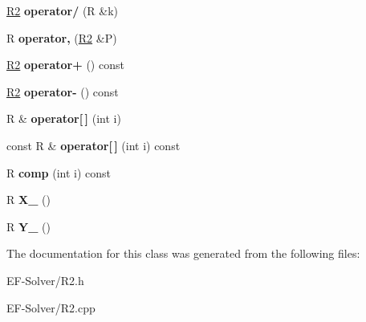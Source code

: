 \begin{DoxyCompactItemize}
\item 
\hyperlink{class_r2}{R2} {\bfseries operator/} (R \&k)\hypertarget{class_r2_af93a8e4a44d871d0330c647f56ab0d6f}{}\label{class_r2_af93a8e4a44d871d0330c647f56ab0d6f}

\item 
R {\bfseries operator,} (\hyperlink{class_r2}{R2} \&P)\hypertarget{class_r2_af741f4176f92a808b6d40d4c20af161f}{}\label{class_r2_af741f4176f92a808b6d40d4c20af161f}

\item 
\hyperlink{class_r2}{R2} {\bfseries operator+} () const \hypertarget{class_r2_a43ec9dd196c4c006ba2cf73c6c7317a3}{}\label{class_r2_a43ec9dd196c4c006ba2cf73c6c7317a3}

\item 
\hyperlink{class_r2}{R2} {\bfseries operator-\/} () const \hypertarget{class_r2_a6b64594c5483c1d56612efa3b52de65a}{}\label{class_r2_a6b64594c5483c1d56612efa3b52de65a}

\item 
R \& {\bfseries operator\mbox{[}$\,$\mbox{]}} (int i)\hypertarget{class_r2_a9648847349f8154bbdb3a0a86bb62ba2}{}\label{class_r2_a9648847349f8154bbdb3a0a86bb62ba2}

\item 
const R \& {\bfseries operator\mbox{[}$\,$\mbox{]}} (int i) const \hypertarget{class_r2_a457945edaa6b37c0aab2854208b61d87}{}\label{class_r2_a457945edaa6b37c0aab2854208b61d87}

\item 
R {\bfseries comp} (int i) const \hypertarget{class_r2_a6f99ccdcd33291ca61b38685a69565ca}{}\label{class_r2_a6f99ccdcd33291ca61b38685a69565ca}

\item 
R {\bfseries X\+\_\+} ()\hypertarget{class_r2_a31773713c895df08e2ee63e56dadb4e9}{}\label{class_r2_a31773713c895df08e2ee63e56dadb4e9}

\item 
R {\bfseries Y\+\_\+} ()\hypertarget{class_r2_a914b12a0f135ece9e36a8dbeeed71a46}{}\label{class_r2_a914b12a0f135ece9e36a8dbeeed71a46}

\end{DoxyCompactItemize}


The documentation for this class was generated from the following files\+:\begin{DoxyCompactItemize}
\item 
E\+F-\/\+Solver/R2.\+h\item 
E\+F-\/\+Solver/R2.\+cpp\end{DoxyCompactItemize}
